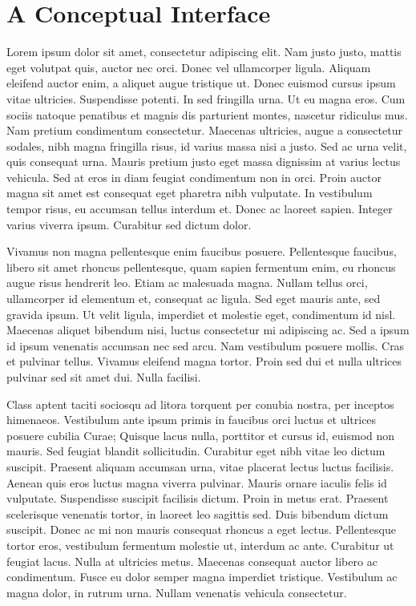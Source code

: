 \chapter{A Conceptual Interface}
Lorem ipsum dolor sit amet, consectetur adipiscing elit.
Nam justo justo, mattis eget volutpat quis, auctor nec orci.
Donec vel ullamcorper ligula.
Aliquam eleifend auctor enim, a aliquet augue tristique ut.
Donec euismod cursus ipsum vitae ultricies.
Suspendisse potenti.
In sed fringilla urna.
Ut eu magna eros.
Cum sociis natoque penatibus et magnis dis parturient montes, nascetur ridiculus mus.
Nam pretium condimentum consectetur.
Maecenas ultricies, augue a consectetur sodales, nibh magna fringilla risus, id varius massa nisi a justo.
Sed ac urna velit, quis consequat urna.
Mauris pretium justo eget massa dignissim at varius lectus vehicula.
Sed at eros in diam feugiat condimentum non in orci.
Proin auctor magna sit amet est consequat eget pharetra nibh vulputate.
In vestibulum tempor risus, eu accumsan tellus interdum et.
Donec ac laoreet sapien.
Integer varius viverra ipsum.
Curabitur sed dictum dolor.

Vivamus non magna pellentesque enim faucibus posuere.
Pellentesque faucibus, libero sit amet rhoncus pellentesque, quam sapien fermentum enim, eu rhoncus augue risus hendrerit leo.
Etiam ac malesuada magna.
Nullam tellus orci, ullamcorper id elementum et, consequat ac ligula.
Sed eget mauris ante, sed gravida ipsum.
Ut velit ligula, imperdiet et molestie eget, condimentum id nisl.
Maecenas aliquet bibendum nisi, luctus consectetur mi adipiscing ac.
Sed a ipsum id ipsum venenatis accumsan nec sed arcu.
Nam vestibulum posuere mollis.
Cras et pulvinar tellus.
Vivamus eleifend magna tortor.
Proin sed dui et nulla ultrices pulvinar sed sit amet dui.
Nulla facilisi.

Class aptent taciti sociosqu ad litora torquent per conubia nostra, per inceptos himenaeos.
Vestibulum ante ipsum primis in faucibus orci luctus et ultrices posuere cubilia Curae; Quisque lacus nulla, porttitor et cursus id, euismod non mauris.
Sed feugiat blandit sollicitudin.
Curabitur eget nibh vitae leo dictum suscipit.
Praesent aliquam accumsan urna, vitae placerat lectus luctus facilisis.
Aenean quis eros luctus magna viverra pulvinar.
Mauris ornare iaculis felis id vulputate.
Suspendisse suscipit facilisis dictum.
Proin in metus erat.
Praesent scelerisque venenatis tortor, in laoreet leo sagittis sed.
Duis bibendum dictum suscipit.
Donec ac mi non mauris consequat rhoncus a eget lectus.
Pellentesque tortor eros, vestibulum fermentum molestie ut, interdum ac ante.
Curabitur ut feugiat lacus.
Nulla at ultricies metus.
Maecenas consequat auctor libero ac condimentum.
Fusce eu dolor semper magna imperdiet tristique.
Vestibulum ac magna dolor, in rutrum urna.
Nullam venenatis vehicula consectetur.

